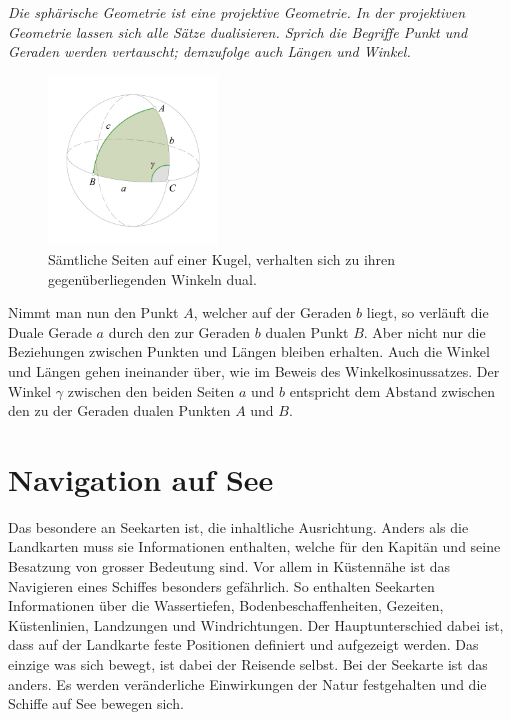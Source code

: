 \begin{refsection}
\begin{satz}\textit{Die sphärische Geometrie ist eine projektive Geometrie. In der projektiven Geometrie lassen sich alle Sätze dualisieren. Sprich die Begriffe Punkt und Geraden werden vertauscht; demzufolge auch Längen und Winkel.}
\label{skript:kugel:satz:Dualitaet}
\end{satz}

\begin{figure}[htbp]
\centering
\includegraphics[width=0.4\textwidth]{kugel/Dualitaet.jpg}
\caption{Sämtliche Seiten auf einer Kugel, verhalten sich zu ihren gegenüberliegenden Winkeln dual.}
\end{figure}


Nimmt man nun den Punkt $A$, welcher auf der Geraden $b$ liegt, so verläuft die Duale Gerade $a$ durch den zur Geraden $b$ dualen Punkt $B$. 
Aber nicht nur die Beziehungen zwischen Punkten und Längen bleiben erhalten. Auch die Winkel und Längen gehen ineinander über, wie im Beweis des Winkelkosinussatzes.
Der Winkel $\gamma$ zwischen den beiden Seiten $a$ und $b$ entspricht dem Abstand zwischen den zu der Geraden dualen Punkten $A$ und $B$.



\section{Navigation auf See}
Das besondere an Seekarten ist, die inhaltliche Ausrichtung. Anders als die Landkarten muss sie Informationen enthalten, welche für den Kapitän und seine Besatzung von grosser Bedeutung sind. Vor allem in Küstennähe ist das Navigieren eines Schiffes besonders gefährlich. So enthalten Seekarten Informationen über die Wassertiefen, Bodenbeschaffenheiten, Gezeiten, Küstenlinien, Landzungen und Windrichtungen.
Der Hauptunterschied dabei ist, dass auf der Landkarte feste Positionen definiert und aufgezeigt werden. Das einzige was sich bewegt, ist dabei der Reisende selbst. Bei der Seekarte ist das anders. Es werden veränderliche Einwirkungen der Natur festgehalten und die Schiffe auf See bewegen sich.


\end{refsection}
